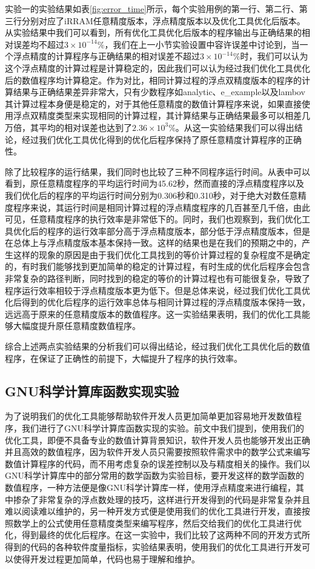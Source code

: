 实验一的实验结果如表\ref{fig:error_time}所示，每个实验用例的第一行、第二行、第三行分别对应了iRRAM任意精度版本，浮点精度版本以及优化工具优化后版本。
从实验结果中我们可以看到，所有优化工具优化后版本的程序输出与正确结果的相对误差均不超过$3 \times 10^{-14}\%$，我们在上一小节实验设置中容许误差中讨论到，当一个浮点精度的计算程序与正确结果的相对误差不超过$3 \times 10^{-14}\%$时，我们可以认为这个浮点精度的计算过程是计算稳定的，因此我们可以认为经过我们优化工具优化后的数值程序均计算稳定。作为对比，相同计算过程的浮点双精度版本的程序的计算结果与正确结果差异非常大，只有少数程序如analytic、e\_example以及lambov其计算过程本身便是稳定的，对于其他任意精度的数值计算程序来说，如果直接使用浮点双精度类型来实现相同的计算过程，其计算结果与正确结果最多可以相差几万倍，其平均的相对误差也达到了$2.36 \times 10^{3}\%$。从这一实验结果我们可以得出结论，经过我们优化工具优化得到的优化后程序保持了原任意精度计算程序的正确性。

除了比较程序的运行结果，我们同时也比较了三种不同程序运行时间。从表中可以看到，原任意精度程序的平均运行时间为45.62秒，然而直接的浮点精度程序以及我们优化后的程序的平均运行时间分别为0.306秒和0.310秒，对于绝大对数任意精度程序来说，其运行时间是相同计算过程的浮点精度程序的几百甚至几千倍，由此可见，任意精度程序的执行效率是非常低下的。同时，我们也观察到，我们优化工具优化后的程序的运行效率部分高于浮点精度版本，部分低于浮点精度版本，但是在总体上与浮点精度版本基本保持一致。这样的结果也是在我们的预期之中的，产生这样的现象的原因是由于我们优化工具找到的等价计算过程的复杂程度不是确定的，有时我们能够找到更加简单的稳定的计算过程，有时生成的优化后程序会包含非常复杂的路径判断，同时找到的稳定的等价的计算过程也有可能很复杂，导致了程序运行效率相较于浮点精度版本更为低下。但是总体来说，经过我们优化工具优化后得到的优化后程序的运行效率总体与相同计算过程的浮点精度版本保持一致，远远高于原来的任意精度版本的数值程序。这一实验结果表明，我们的优化工具能够大幅度提升原任意精度数值程序。

综合上述两点实验结果的分析我们可以得出结论，经过我们优化工具优化后的数值程序，在保证了正确性的前提下，大幅提升了程序的执行效率。


\subsection{GNU科学计算库函数实现实验}

为了说明我们的优化工具能够帮助软件开发人员更加简单更加容易地开发数值程序，我们进行了GNU科学计算库函数实现的实验。前文中我们提到，使用我们的优化工具，即便不具备专业的数值计算背景知识，软件开发人员也能够开发出正确并且高效的数值程序，因为软件开发人员只需要按照软件需求中的数学公式来编写数值计算程序的代码，而不用考虑复杂的误差控制以及与精度相关的操作。我们以GNU科学计算库中的部分常用的数学函数为实验目标，要开发这样的数学函数的数值程序，一种方法便是像GNU科学计算库一样，使用浮点精度来进行编程，其中掺杂了非常复杂的浮点数处理的技巧，这样进行开发得到的代码是非常复杂并且难以阅读难以维护的，另一种开发方式便是使用我们的优化工具进行开发，直接按照数学上的公式使用任意精度类型来编写程序，然后交给我们的优化工具进行优化，得到最终的优化后程序。在这一实验中，我们比较了这两种不同的开发方式所得到的代码的各种软件度量指标，实验结果表明，使用我们的优化工具进行开发可以使得开发过程更加简单，代码也易于理解和维护。

